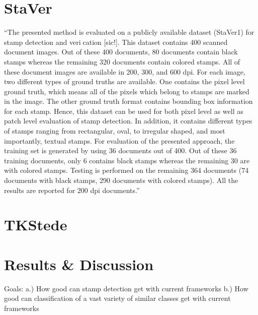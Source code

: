 \section{StaVer}\label{sect:staver}
``The presented method is evaluated on a publicly available dataset (StaVer1) for stamp
detection and verication [sic!]. This dataset contains 400 scanned document images. Out
of these 400 documents, 80 documents contain black stamps whereas the remaining 320
documents contain colored stamps. All of these document images are available in 200,
300, and 600 dpi. For each image, two different types of ground truths are available.
One contains the pixel level ground truth, which means all of the pixels which belong to
stamps are marked in the image. The other ground truth format contains bounding box
information for each stamp. Hence, this dataset can be used for both pixel level as well
as patch level evaluation of stamp detection. In addition, it contains different types of
stamps ranging from rectangular, oval, to irregular shaped, and most importantly, textual
stamps.
For evaluation of the presented approach, the training set is generated by using 36 documents
out of 400. Out of these 36 training documents, only 6 contains black stamps
whereas the remaining 30 are with colored stamps. Testing is performed on the remaining
364 documents (74 documents with black stamps, 290 documents with colored stamps).
All the results are reported for 200 dpi documents.''~\cite{Ahmed.2016}

\section{TKStede}\label{sect:tkstede}
\blindtext[1]

\section{Results \& Discussion}\label{sect:results-and-discussion}
Goals: 
    a.) How good can stamp detection get with current frameworks
    b.) How good can classification of a vast variety of similar classes get
        with current frameworks